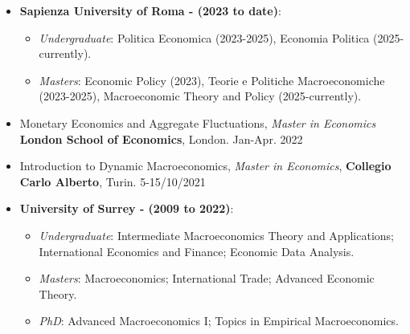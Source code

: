 \documentclass[margin, 11pt]{res} %
\begin{document}
\begin{resume}
\begin{itemize}
    \item \textbf{Sapienza University of Roma - (2023 to date)}:
    \begin{itemize}
        \item \emph{Undergraduate}: Politica Economica (2023-2025), Economia Politica (2025-currently). 
        \item \emph{Masters}: Economic Policy (2023), Teorie e Politiche Macroeconomiche (2023-2025), Macroeconomic Theory and Policy (2025-currently).  
    \end{itemize}

    \item Monetary Economics and Aggregate Fluctuations, \emph{Master in Economics} \textbf{London School of Economics}, London. \hfill Jan-Apr. 2022 
    \item Introduction to Dynamic Macroeconomics, \emph{Master in Economics}, \textbf{Collegio Carlo Alberto}, Turin. \hfill 5-15/10/2021 
    \item \textbf{University of Surrey - (2009 to 2022)}:

\begin{itemize}
	\item \emph{Undergraduate}: Intermediate Macroeconomics Theory and Applications; International Economics and Finance; Economic Data Analysis. 
	\item \emph{Masters}: Macroeconomics; International Trade; Advanced Economic Theory. 
	\item \emph{PhD}: Advanced Macroeconomics I; Topics in Empirical Macroeconomics. 
\end{itemize}
\end{itemize}




\end{resume}
\end{document}
